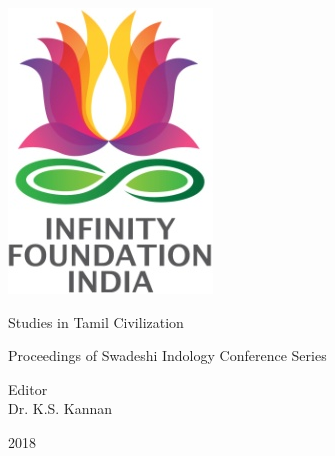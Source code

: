 \thispagestyle{empty}

\includegraphics{"images/logo.png"}

Studies in Tamil Civilization


Proceedings of Swadeshi Indology Conference Series

Editor\\Dr. K.S. Kannan


2018

